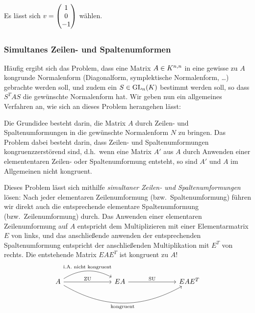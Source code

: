 \section{}





\subsection{}

Es lässt sich $v = \columnvector{1 \\ 0 \\ -1}$ wählen.





\addtocounter{subsection}{1}
\subsection{}



\subsubsection*{Simultanes Zeilen- und Spaltenumformen}
Häufig ergibt sich das Problem, dass eine Matrix $A \in \matrices{n}{K}$ in eine gewisse zu $A$ kongrunde Normalenform (Diagonalform, symplektische Normalenform, \dots) gebrachte werden soll, und zudem ein $S \in \GL{n}{K}$ bestimmt werden soll, so dass $S^T A S$ die gewünschte Normalenform hat.
Wir geben nun ein allgemeines Verfahren an, wie sich an dieses Problem herangehen lässt:

Die Grundidee besteht darin, die Matrix $A$ durch Zeilen- und Spaltenumformungen in die gewünschte Normalenform $N$ zu bringen.
Das Problem dabei besteht darin, dass Zeilen- und Spaltenumformungen kongruenzzerstörend sind, d.h.\ wenn eine Matrix $A'$ aus $A$ durch Anwenden einer elemententaren Zeilen- oder Spaltenumformung entsteht, so sind $A'$ und $A$ im Allgemeinen nicht kongruent.

Dieses Problem lässt sich mithilfe \emph{simultaner Zeilen- und Spaltenumformungen} lösen:
Nach jeder elementaren Zeilenumformung (bzw.\ Spaltenumformung) führen wir direkt auch die entsprechende elementare Spaltenumformung (bzw.\ Zeilenumformung) durch.
Das Anwenden einer elementaren Zeilenumformung auf $A$ entspricht dem Multiplizieren mit einer Elementarmatrix $E$ von links, und das anschließende anwenden der entsprechenden Spaltenumformung entspricht der anschließenden Multiplikation mit $E^T$ von rechts.
Die entstehende Matrix $E A E^T$ ist kongruent zu $A$!
\[
  \begin{tikzcd}[column sep = 7em]
      A
      \arrow{r}[above]{\text{ZU}}
      \arrow[bend left]{r}[above]{\text{i.A.\ nicht kongruent}}
      \arrow[bend right]{rr}[below]{\text{kongruent}}
    & EA
      \arrow{r}[above]{\text{SU}}
    & EAE^T
  \end{tikzcd}
\]

